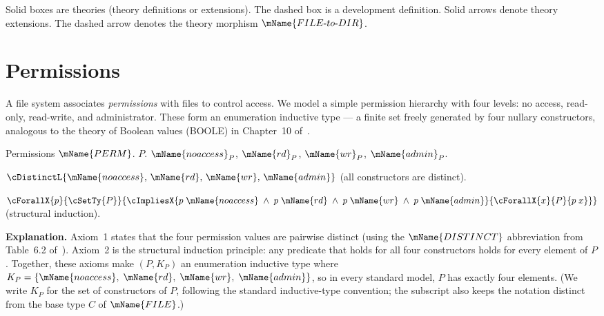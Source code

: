 \documentclass[11pt]{article}
\newcommand{\PERM}{\mName{PERM}}
\newcommand{\FILETYPE}{\mName{FILE}}
\begin{document}
Solid boxes are theories (theory definitions or extensions).  The
dashed box is a development definition.  Solid arrows denote theory
extensions.  The dashed arrow denotes the theory morphism
$\mName{FILE\text{-}to\text{-}DIR}$.

\medskip

\newpage
\section{Permissions}
\label{sec:perm}

A file system associates \emph{permissions} with files to control
access.  We model a simple permission hierarchy with four levels:
no access, read-only, read-write, and administrator.  These form
an enumeration inductive type --- a finite set freely generated by
four nullary constructors, analogous to the theory of Boolean
values (BOOLE) in Chapter~10 of~\cite{farmer2025}.

\begin{theory-def}
{Permissions}
{$\PERM$.}
{$P$.}
{$\mName{noaccess}_P$,\;
 $\mName{rd}_P$,\;
 $\mName{wr}_P$,\;
 $\mName{admin}_P$.}
{
\be
\item $\cDistinctL{\mName{noaccess},\, \mName{rd},\,
      \mName{wr},\, \mName{admin}}$
      \hfill (all constructors are distinct).

\item $\cForallX{p}{\cSetTy{P}}{
      \cImpliesX{p\;\mName{noaccess} \;\wedge\;
        p\;\mName{rd} \;\wedge\;
        p\;\mName{wr} \;\wedge\;
        p\;\mName{admin}}{
        \cForallX{x}{P}{p\;x}}}$
      \hfill (structural induction).
\ee
}
\end{theory-def}

\medskip
\noindent\textbf{Explanation.}
Axiom~1 states that the four permission values are pairwise
distinct (using the $\mName{DISTINCT}$ abbreviation from
Table~6.2 of~\cite{farmer2025}).  Axiom~2 is the structural
induction principle: any predicate that holds for all four
constructors holds for every element of $P$.  Together, these
axioms make $(P, K_P)$ an enumeration inductive type where
$K_P = \{\mName{noaccess},\; \mName{rd},\; \mName{wr},\;
\mName{admin}\}$, so in every standard model, $P$ has exactly
four elements.  (We write $K_P$ for the set of constructors of $P$,
following the standard inductive-type convention; the subscript
also keeps the notation distinct from the base type $C$ of
$\FILETYPE$.)
\end{document}
